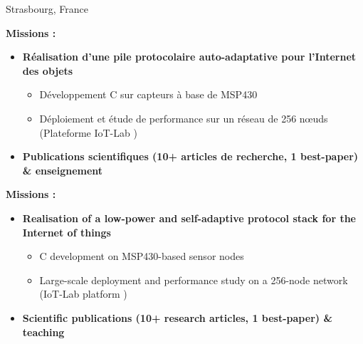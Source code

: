 {}{}{Strasbourg, France}{
\ifnativelang
	\textcolor{color1}{\textbf{Missions :}}
	\begin{itemize}[leftmargin=\ListItemsMargins]
		\item \textbf{R\'ealisation d'une pile protocolaire auto-adaptative pour l'Internet des objets}
		\begin{itemize}
			\item D\'eveloppement C sur capteurs \`a base de MSP430
			\item D\'eploiement et étude de performance sur un r\'eseau de 256 n\oe uds (Plateforme IoT-Lab \textcolor{color1}{\href{https://www.iot-lab.info/}{\ExternalLink}})
		\end{itemize}
		\ifaddmngt
		\item \textbf{Publications scientifiques (10+ articles de recherche, 1 best-paper) \& enseignement}
		\fi
	\end{itemize}
\else
	\textcolor{color1}{\textbf{Missions :}}
	\begin{itemize}[leftmargin=\ListItemsMargins]
		\item \textbf{Realisation of a low-power and self-adaptive protocol stack for the Internet of things}
		\begin{itemize}
			\item C development on MSP430-based sensor nodes
			\item Large-scale deployment and performance study on a 256-node network  (IoT-Lab platform \textcolor{color1}{\href{https://www.iot-lab.info/}{\ExternalLink}})
		\end{itemize}
		\ifaddmngt
		\item \textbf{Scientific publications (10+ research articles, 1 best-paper) \& teaching}
		\fi
	\end{itemize}
\fi
}


